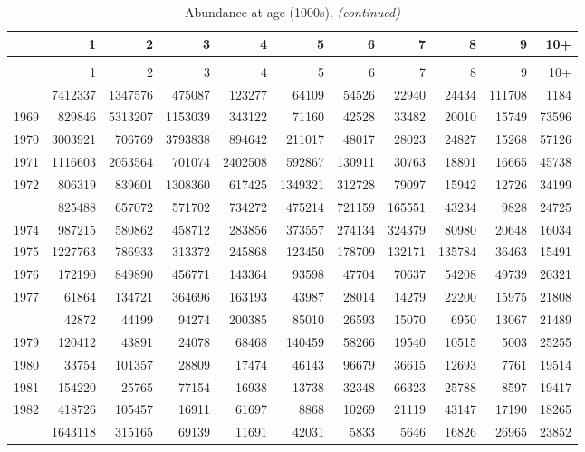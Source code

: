 \documentclass[
]{article}
\begin{document}
\begin{longtable}[t]{lrrrrrrrrrr}
\caption{\label{tab:NAA-table}Abundance at age (1000s).}\\
\toprule
  & 1 & 2 & 3 & 4 & 5 & 6 & 7 & 8 & 9 & 10+\\
\midrule
\endfirsthead
\caption[]{Abundance at age (1000s). \textit{(continued)}}\\
\toprule
  & 1 & 2 & 3 & 4 & 5 & 6 & 7 & 8 & 9 & 10+\\
\midrule
\endhead

\endfoot
\bottomrule
\endlastfoot
1968 & 7412337 & 1347576 & 475087 & 123277 & 64109 & 54526 & 22940 & 24434 & 111708 & 1184\\
1969 & 829846 & 5313207 & 1153039 & 343122 & 71160 & 42528 & 33482 & 20010 & 15749 & 73596\\
1970 & 3003921 & 706769 & 3793838 & 894642 & 211017 & 48017 & 28023 & 24827 & 15268 & 57126\\
1971 & 1116603 & 2053564 & 701074 & 2402508 & 592867 & 130911 & 30763 & 18801 & 16665 & 45738\\
1972 & 806319 & 839601 & 1308360 & 617425 & 1349321 & 312728 & 79097 & 15942 & 12726 & 34199\\
\addlinespace
1973 & 825488 & 657072 & 571702 & 734272 & 475214 & 721159 & 165551 & 43234 & 9828 & 24725\\
1974 & 987215 & 580862 & 458712 & 283856 & 373557 & 274134 & 324379 & 80980 & 20648 & 16034\\
1975 & 1227763 & 786933 & 313372 & 245868 & 123450 & 178709 & 132171 & 135784 & 36463 & 15491\\
1976 & 172190 & 849890 & 456771 & 143364 & 93598 & 47704 & 70637 & 54208 & 49739 & 20321\\
1977 & 61864 & 134721 & 364696 & 163193 & 43987 & 28014 & 14279 & 22200 & 15975 & 21808\\
\addlinespace
1978 & 42872 & 44199 & 94274 & 200385 & 85010 & 26593 & 15070 & 6950 & 13067 & 21489\\
1979 & 120412 & 43891 & 24078 & 68468 & 140459 & 58266 & 19540 & 10515 & 5003 & 25255\\
1980 & 33754 & 101357 & 28809 & 17474 & 46143 & 96679 & 36615 & 12693 & 7761 & 19514\\
1981 & 154220 & 25765 & 77154 & 16938 & 13738 & 32348 & 66323 & 25788 & 8597 & 19417\\
1982 & 418726 & 105457 & 16911 & 61697 & 8868 & 10269 & 21119 & 43147 & 17190 & 18265\\
\addlinespace
1983 & 1643118 & 315165 & 69139 & 11691 & 42031 & 5833 & 5646 & 16826 & 26965 & 23852\\

\end{longtable}
\end{document}
